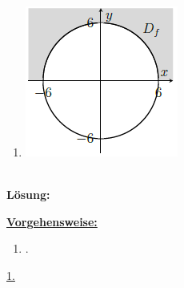 \begin{enumerate}
\begin{center}
	\end{center}
	\item
	\begin{center}
		\includegraphics[scale=0.6]{pictures/3_4_d}
	\end{center}
\end{enumerate}
\ \\
\textbf{Lösung:}
\begin{mdframed}
\underline{\textbf{Vorgehensweise:}}
\renewcommand{\labelenumi}{\theenumi.}
\begin{enumerate}
\item .

\end{enumerate}
\end{mdframed}

\underline{1.}\\

\newpage

